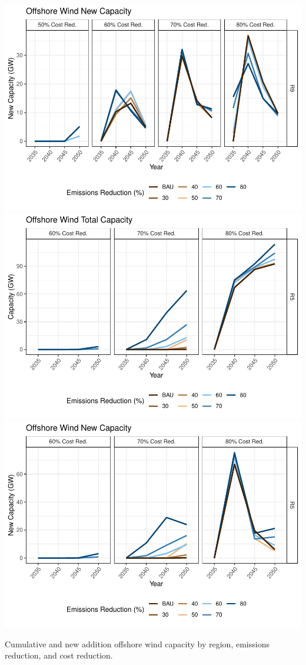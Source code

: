 \documentclass[]{article}
\begin{document}
\includegraphics[width=0.5\linewidth]{osw_Report_files/figure-latex/unnamed-chunk-14-10}
\includegraphics[width=0.5\linewidth]{osw_Report_files/figure-latex/unnamed-chunk-14-11}
\includegraphics[width=0.5\linewidth]{osw_Report_files/figure-latex/unnamed-chunk-14-12}

Cumulative and new addition offshore wind capacity by region, emissions
reduction, and cost reduction.
\end{document}
